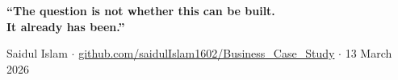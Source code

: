 \documentclass[12pt,a4paper]{article}
\begin{document}
\vspace{1em}
\begin{center}
\Large\bfseries\color{NordicBlue}
``The question is not whether this can be built.\\It already has been.''
\end{center}

\vfill
\begin{center}
\small\color{SlateGray}
Saidul Islam $\cdot$ \href{https://github.com/saidulIslam1602/Business_Case_Study}{github.com/saidulIslam1602/Business\_Case\_Study} $\cdot$ 13 March 2026
\end{center}
\end{document}
